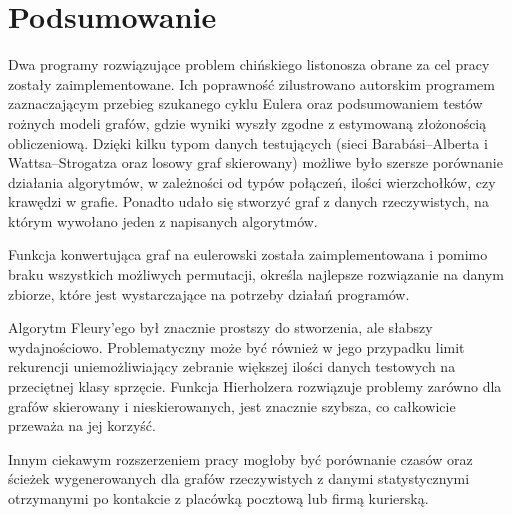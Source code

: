 \documentclass[a4paper, 12pt, twoside, openright]{article}
\begin{document}
\newpage
\section{Podsumowanie}
\indent\par
Dwa programy rozwiązujące problem chińskiego listonosza obrane za cel pracy zostały zaimplementowane. Ich poprawność zilustrowano autorskim programem zaznaczającym przebieg szukanego cyklu Eulera oraz podsumowaniem testów rożnych modeli grafów, gdzie wyniki wyszły zgodne z estymowaną złożonością obliczeniową. Dzięki kilku typom danych testujących (sieci Barabási–Alberta i Wattsa–Strogatza oraz losowy graf skierowany) możliwe było szersze porównanie działania algorytmów, w zależności od typów połączeń, ilości wierzchołków, czy krawędzi w grafie. Ponadto udało się stworzyć graf z danych rzeczywistych, na którym wywołano jeden z napisanych algorytmów.

Funkcja konwertująca graf na eulerowski została zaimplementowana i pomimo braku wszystkich możliwych permutacji, określa najlepsze rozwiązanie na danym zbiorze, które jest wystarczające na potrzeby działań programów.

Algorytm Fleury'ego był znacznie prostszy do stworzenia, ale słabszy wydajnościowo. Problematyczny może być również w jego przypadku limit rekurencji uniemożliwiający zebranie większej ilości danych testowych na przeciętnej klasy sprzęcie.
Funkcja Hierholzera rozwiązuje problemy zarówno dla grafów skierowany i nieskierowanych, jest znacznie szybsza, co całkowicie przeważa na jej korzyść.

Innym ciekawym rozszerzeniem pracy mogłoby być porównanie czasów oraz ścieżek wygenerowanych dla grafów rzeczywistych z danymi statystycznymi otrzymanymi po kontakcie z placówką pocztową lub firmą kurierską.


\end{document}
